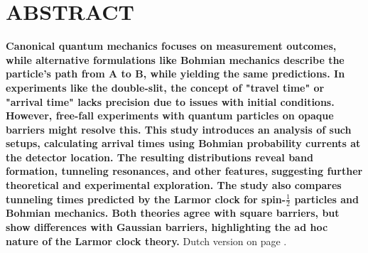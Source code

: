 \section*{ABSTRACT}

\textbf{Canonical quantum mechanics focuses on measurement outcomes, while alternative formulations like Bohmian mechanics describe the particle's path from A to B, while yielding the same predictions. In experiments like the double-slit, the concept of "travel time" or "arrival time" lacks precision due to issues with initial conditions. However, free-fall experiments with quantum particles on opaque barriers might resolve this. This study introduces an analysis of such setups, calculating arrival times using Bohmian probability currents at the detector location. The resulting distributions reveal band formation, tunneling resonances, and other features, suggesting further theoretical and experimental exploration. The study also compares tunneling times predicted by the Larmor clock for spin-$\frac{1}{2}$ particles and Bohmian mechanics. Both theories agree with square barriers, but show differences with Gaussian barriers, highlighting the ad hoc nature of the Larmor clock theory.} Dutch version on page \pageref{dutch-abstract}.